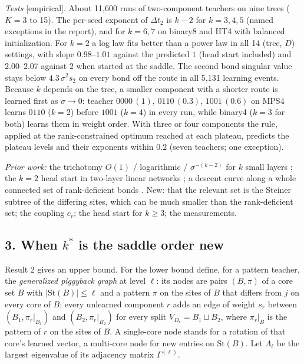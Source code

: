 \documentclass[11pt]{article}
\newcommand{\NEW}{\colorbox{ForestGreen!22}{\textsf{\small new}}}
\newcommand{\ev}[1]{\textsf{\small[#1]}}
\newcommand{\St}{\mathrm{St}}
\begin{document}
\emph{Tests} \ev{empirical}. About 11,600 runs of two-component teachers on nine trees ($K=3$ to 15). The
per-seed exponent of $\Delta t_2$ is $k-2$ for $k=3,4,5$ (named exceptions in the report), and for $k=6,7$ on
binary8 and HT4 with balanced initialization. For $k=2$ a log law fits better than a power law in all 14
(tree, $D$) settings, with slope $0.98$--$1.01$ against the predicted $1$ (head start included) and $2.00$--$2.07$ against $2$
when started at the saddle. The second bond singular value stays below $4.3\,\sigma^2 s_2$ on every bond off
the route in all 5,131 learning events. Because $k$ depends on the tree, a smaller component with a shorter route is
learned first as $\sigma\to0$: teacher $0000\,(1)$, $0110\,(0.3)$, $1001\,(0.6)$ on MPS4 learns $0110$
($k=2$) before $1001$ ($k=4$) in every run, while binary4 ($k=3$ for both) learns them in weight order.
With three or four components the rule, applied at the rank-constrained optimum reached at each plateau,
predicts the plateau levels and their exponents within $0.2$ (seven teachers; one exception).

\emph{Prior work:} the trichotomy $O(1)$ / logarithmic / $\sigma^{-(k-2)}$ for $k$ small layers
\citep[Thm~4.2]{rawal2026theory}; the $k=2$ head start in two-layer linear networks
\citep[Thm~4]{zhang2026saddletosaddle}; a descent curve along a whole connected set of rank-deficient bonds
\citep[Lemma~D.8]{furman2026benign}. New: that the relevant set is the Steiner subtree of the differing
sites, which can be much smaller than the rank-deficient set; the coupling $c_r$; the head start for
$k\ge3$; the measurements.

\subsection*{3. When $k^*$ is the saddle order \hfill\NEW}
Result 2 gives an upper bound. For the lower bound define, for a pattern teacher, the \emph{generalized
piggyback graph} at level $\ell$: its nodes are pairs $(B,\pi)$ of a core set $B$ with $\lvert\St(B)\rvert\le\ell$
and a pattern $\pi$ on the sites of $B$ that differs from $j$ on every core of $B$; every unlearned
component $r$ adds an edge of weight $s_r$ between $(B_1,\pi_r|_{B_1})$ and $(B_2,\pi_r|_{B_2})$ for every split
$V_{D_r}=B_1\sqcup B_2$, where $\pi_r|_B$ is the pattern of $r$ on the sites of $B$. A single-core node
stands for a rotation of that core's learned vector, a multi-core node for new entries on $\St(B)$. Let $\Lambda_\ell$ be the largest eigenvalue of its adjacency matrix $\Gamma^{(\ell)}$.
\end{document}
